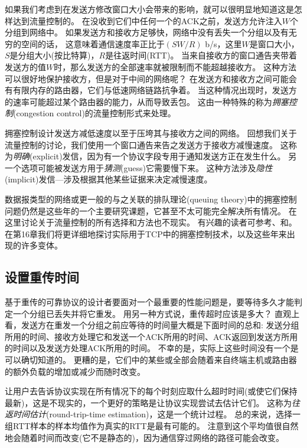 \documentclass{../main.tex}{subfiles}
\begin{document}
如果我们考虑到在发送方修改窗口大小会带来的影响，就可以很明显地知道这是怎样达到流量控制的。
在没收到它们中任何一个的ACK之前，发送方允许注入$W$个分组到网络中。
如果发送方和接收方足够快，网络中没有丢失一个分组以及有无穷的空间的话，
这意味着通信速度率正比于$(SW/R)$ b/s，这里$W$是窗口大小，$S$是分组大小(按比特算)，$R$是往返时间(RTT)。
当来自接收方的窗口通告夹带着发送方的值$W$时，那么发送方的全部速率就被限制而不能超越接收方。
这种方法可以很好地保护接收方，但是对于中间的网络呢？
在发送方和接收方之间可能会有有限内存的路由器，它们与低速网络链路抗争着。
当这种情况出现时，发送方的速率可能超过某个路由器的能力，从而导致丢包。
这由一种特殊的称为\emph{拥塞控制}(congestion control)的流量控制形式来处理。

拥塞控制设计发送方减低速度以至于压垮其与接收方之间的网络。
回想我们关于流量控制的讨论，我们使用一个窗口通告来告之发送方于接收方减慢速度。
这称为\emph{明确}(explicit)发信，因为有一个协议字段专用于通知发送方正在发生什么。
另一个选项可能被发送方用于\emph{猜测}(guess)它需要慢下来。
这种方法涉及\emph{隐性}(implicit)发信---涉及根据其他某些证据来决定减慢速度。

数据报类型的网络或更一般的与之关联的排队理论(queuing theory)中的拥塞控制问题仍然是这些年的一个主要研究课题，它甚至不太可能完全解决所有情况。
在这里讨论关于流量控制的所有选择和方法也不现实。
有兴趣的读者可参考\cite{Jain1990Congestion}、\cite{1997An}和\cite{Kleinrock1975Queueing}。
在第16章我们将更详细地探讨实际用于TCP中的拥塞控制技术，以及这些年来出现的许多变体。

\subsection{设置重传时间}
基于重传的可靠协议的设计者要面对一个最重要的性能问题是，要等待多久才能判定一个分组已丢失并将它重发。
用另一种方式说，重传超时应该是多大？
直观上看，发送方在重发一个分组之前应等待的时间量大概是下面时间的总和:
发送分组所用的时间、接收方处理它和发送一个ACK所用的时间、ACK返回到发送方所用的时间以及发送方处理ACK所用的时间。
不幸的是，实际上这些时间没有一个是可以确切知道的。
更糟的是，它们中的某些或全部会随着来自终端主机或路由器的额外负载的增加或减少而随时改变。

让用户去告诉协议实现在所有情况下的每个时刻应取什么超时时间(或使它们保持最新)，这是不现实的，一个更好的策略是让协议实现尝试去估计它们。
这称为\emph{往返时间估计}(round-trip-time estimation)，这是一个统计过程。
总的来说，选择一组RTT样本的样本均值作为真实的RTT是最有可能的。
注意到这个平均值很自然地会随着时间而改变(它不是静态的)，因为通信穿过网络的路径可能会改变。
\end{document}
